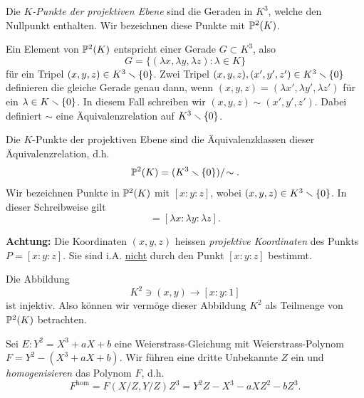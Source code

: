 \begin{definition}
  Die \emph{$K$-Punkte der projektiven Ebene} sind die Geraden in $K^3$,
  welche den Nullpunkt enthalten. Wir bezeichnen diese Punkte mit
  ${\mathbb{P}}^2(K)$. 
\end{definition}

\begin{bemerkung}
  Ein Element von ${\mathbb{P}}^2(K)$ entspricht einer Gerade $G\subset K^3$,
  also
  $$ G = \{ (\lambda x,\lambda y,\lambda z) : \lambda\in K\}$$
  für ein Tripel $(x,y,z)\in K^3\smallsetminus\{0\}$. Zwei Tripel
  $(x,y,z),(x',y',z')\in K^3\smallsetminus\{0\}$ definieren die gleiche Gerade
  genau dann, wenn
  $(x,y,z)=(\lambda x',\lambda y',\lambda z')$ für ein $\lambda\in
  K\smallsetminus\{0\}$.
  In diesem Fall schreiben wir $(x,y,z)\sim (x',y',z')$. Dabei
  definiert $\sim$ eine Äquivalenzrelation auf $K^3\smallsetminus\{0\}$.

  Die $K$-Punkte der projektiven Ebene sind die Äquivalenzklassen dieser
  Äquivalenzrelation, d.h. 
  \begin{equation*}
    {\mathbb{P}}^2(K) = (K^3\smallsetminus\{0\})/\!\sim.
  \end{equation*}
  Wir bezeichnen Punkte in ${\mathbb{P}}^2(K)$ mit $[x:y:z]$, wobei $(x,y,z)\in
  K^3\smallsetminus\{0\}$.
  In dieser Schreibweise gilt
  \begin{equation*}
    [x:y:z] = [\lambda x : \lambda y : \lambda z]. 
  \end{equation*}

  \textbf{Achtung:} Die Koordinaten $(x,y,z)$ heissen \emph{projektive
    Koordinaten} des Punkts $P=[x:y:z]$. Sie sind i.A.
  \underline{nicht} durch den Punkt $[x:y:z]$ bestimmt.

  Die Abbildung
  \begin{equation}
    \label{eq:affinechart}
    K^2\ni (x,y)\rightarrow [x:y:1] 
  \end{equation}
  ist injektiv. Also
  können wir vermöge dieser Abbildung $K^2$ als Teilmenge von
  ${\mathbb{P}}^2(K)$ betrachten. 
\end{bemerkung}


Sei $E: Y^2 = X^3+aX+b$ eine Weierstrass-Gleichung mit
Weierstrass-Polynom $F = Y^2 - (X^3+aX+b)$. Wir führen eine dritte
Unbekannte $Z$ ein und \emph{homogenisieren} das Polynom $F$, d.h.
\begin{equation}
  \label{eq:homogenisierung}
  F^{\mathrm{hom}} = F(X/Z,Y/Z)Z^3 = Y^2Z - X^3 - aXZ^2 -bZ^3.
\end{equation}

